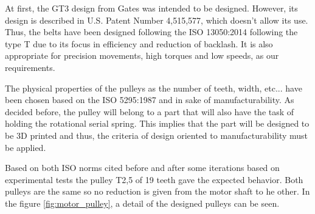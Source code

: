At first, the GT3 design from Gates was intended to be designed.
However, its design is described in U.S. Patent Number 4,515,577, which doesn't allow its use.
Thus, the belts have been designed following the ISO 13050:2014 \cite{ISO13050} following the type T due to its focus in efficiency and reduction of backlash.
It is also appropriate for precision movements, high torques and low speeds, as our requirements.

The physical properties of the pulleys as the number of teeth, width, etc... have been chosen based on the ISO 5295:1987 \cite{ISO5295} and in sake of manufacturability.
As decided before, the pulley will belong to a part that will also have the task of holding the rotational serial spring.
This implies that the part will be designed to be 3D printed and thus, the criteria of design oriented to manufacturability must be applied.

Based on both ISO norms cited before and after some iterations based on experimental tests the pulley T2,5 of 19 teeth gave the expected behavior.
Both pulleys are the same so no reduction is given from the motor shaft to he other.
In the figure \ref{fig:motor_pulley}, a detail of the designed pulleys can be seen.

